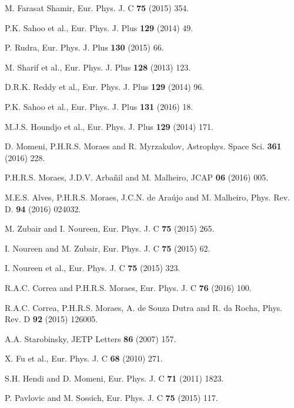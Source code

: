 \begin{thebibliography}{99}
 M. Farasat Shamir, Eur. Phys. J. C \textbf{75}
(2015) 354.

 P.K. Sahoo et al., Eur. Phys. J. Plus \textbf{129}
(2014) 49.

 P. Rudra, Eur. Phys. J. Plus \textbf{130} (2015) 66.

 M. Sharif et al., Eur. Phys. J. Plus \textbf{128}
(2013) 123.

 D.R.K. Reddy et al., Eur. Phys. J. Plus \textbf{129}
(2014) 96.

 P.K. Sahoo et al., Eur. Phys. J. Plus \textbf{131}
(2016) 18.

 M.J.S. Houndjo et al., Eur. Phys. J. Plus \textbf{129}
(2014) 171.

 D. Momeni, P.H.R.S. Moraes and R. Myrzakulov, Astrophys.
Space Sci. \textbf{361} (2016) 228.

 P.H.R.S. Moraes, J.D.V. Arba\~nil and M. Malheiro, JCAP \textbf{06} (2016)
005.

 M.E.S. Alves, P.H.R.S. Moraes, J.C.N. de Ara\'ujo and M.
Malheiro, Phys. Rev. D. {\bf 94} (2016) 024032.

 M. Zubair and I. Noureen, Eur. Phys. J. C \textbf{75}
(2015) 265.

 I. Noureen and M. Zubair, Eur. Phys. J. C \textbf{75}
(2015) 62.

 I. Noureen et al., Eur. Phys. J. C \textbf{75}
(2015) 323.

 R.A.C. Correa and P.H.R.S. Moraes, Eur. Phys. J. C \textbf{%
76} (2016) 100.

 R.A.C. Correa, P.H.R.S. Moraes, A. de Souza Dutra and
R. da Rocha, Phys. Rev. D \textbf{92} (2015) 126005.

 A.A. Starobinsky, JETP Letters \textbf{86} (2007)
157. 


 X. Fu et al., Eur. Phys. J. C \textbf{68} (2010) 271.

 S.H. Hendi and D. Momeni, Eur. Phys. J. C \textbf{71}
(2011) 1823.

 P. Pavlovic and M. Sossich, Eur. Phys. J. C \textbf{%
75} (2015) 117.


\end{thebibliography}
